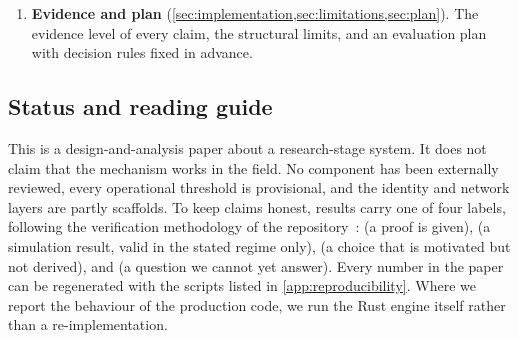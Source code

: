 \begin{enumerate}
    with the correction adopted in the repository (decisions D32--D41) and the experiments that
    support it. Among them are a side-balanced bridge score, invariant under every gauge and exactly
    camp-balanced in the two-camp model (\cref{prop:side}), and randomized exploration. The
    O1 target amendment of 11 October 2026 restates \cref{prop:ipw} as a conditional result
    for the expected score; it supplies no properness guarantee for the current draw or reputation.
  \item \textbf{Evidence and plan} (\cref{sec:implementation,sec:limitations,sec:plan}).
    The evidence level of every claim, the structural limits, and an evaluation plan with
    decision rules fixed in advance.
\end{enumerate}

\subsection{Status and reading guide}

This is a design-and-analysis paper about a research-stage system. It does not claim that the
mechanism works in the field. No component has been externally reviewed, every operational
threshold is provisional, and the identity and network layers are partly scaffolds. To keep
claims honest, results carry one of four labels, following the verification methodology of
the repository~\cite{isegoria-repo}:
\proved{} (a proof is given),
\empirical{} (a simulation result, valid in the stated regime only),
\designchoice{} (a choice that is motivated but not derived), and
\openq{} (a question we cannot yet answer).
Every number in the paper can be regenerated with the scripts listed in
\cref{app:reproducibility}. Where we report the behaviour of the production code, we run the
Rust engine itself rather than a re-implementation.
